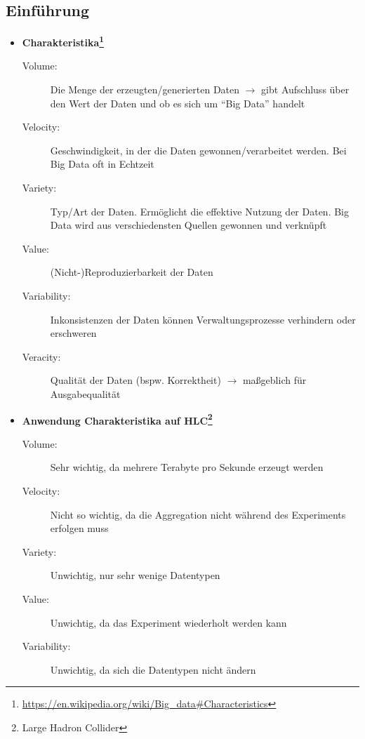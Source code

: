 \subsection{Einführung}
\begin{itemize}
	\item \textbf{Charakteristika\footnote{\url{https://en.wikipedia.org/wiki/Big_data\#Characteristics}}}
	\begin{description}
		\item[Volume:] Die Menge der erzeugten/generierten Daten \(\rightarrow\) gibt Aufschluss über den Wert der Daten und ob es sich um "`Big Data"' handelt
		\item[Velocity:] Geschwindigkeit, in der die Daten gewonnen/verarbeitet werden. Bei Big Data oft in Echtzeit
		\item[Variety:] Typ/Art der Daten. Ermöglicht die effektive Nutzung der Daten. Big Data wird aus verschiedensten Quellen gewonnen und verknüpft
		\item[Value:] (Nicht-)Reproduzierbarkeit der Daten
		\item[Variability:] Inkonsistenzen der Daten können Verwaltungsprozesse verhindern oder erschweren
		\item[Veracity:] Qualität der Daten (bspw. Korrektheit) \(\rightarrow\) maßgeblich für Ausgabequalität
	\end{description}
	\item \textbf{Anwendung Charakteristika auf HLC\footnote{Large Hadron Collider}}
	\begin{description}
		\item[Volume:] Sehr wichtig, da mehrere Terabyte pro Sekunde erzeugt werden
		\item[Velocity:] Nicht so wichtig, da die Aggregation nicht während des Experiments erfolgen muss
		\item[Variety:] Unwichtig, nur sehr wenige Datentypen
		\item[Value:] Unwichtig, da das Experiment wiederholt werden kann
		\item[Variability:] Unwichtig, da sich die Datentypen nicht ändern 
	\end{description}
\end{itemize}



